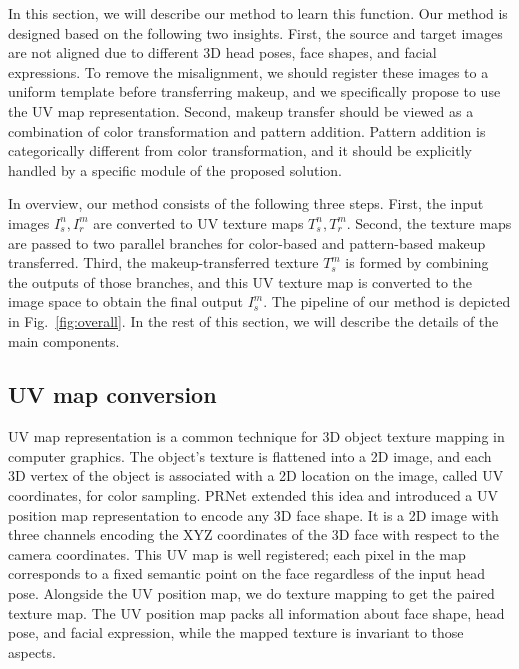 \documentclass[final]{cvpr}
\newcommand{\Fref}[1]{Fig.~\ref{#1}}
\begin{document}
In this section, we will describe our method to learn this function. Our method is designed based on the following two insights. First, the source and target images are not aligned due to different 3D head poses, face shapes, and facial expressions. To remove the misalignment, we should register these images to a uniform template before transferring makeup, and we specifically propose to use the UV map representation. Second, makeup transfer should be viewed as a combination of color transformation and pattern addition. Pattern addition is categorically different from color transformation, and it should be explicitly handled by a specific module of the proposed solution.


In overview, our method consists of the following three steps. First, the input images $I_{s}^{n}, I_{r}^{m}$ are converted to UV texture maps $T_{s}^{n}, T_{r}^{m}$. Second, the texture maps are passed to two parallel branches for color-based and pattern-based makeup transferred. Third, the makeup-transferred texture $T_{s}^{m}$ is formed by combining the outputs of those branches, and this UV texture map is converted to the image space to obtain the final output $I_{s}^{m}$. The pipeline of our method is depicted in \Fref{fig:overall}. In the rest of this section, we will describe the details of the main components. 








\subsection{UV map conversion}\label{sec:uv}
\vspace{-2mm}
UV map representation is a common technique for 3D object texture mapping in computer graphics. The object's texture is flattened into a 2D image, and each 3D vertex of the object is associated with a 2D location on the image, called UV coordinates, for color sampling. PRNet \cite{feng2018prn} extended this idea and introduced a UV position map representation to encode any 3D face shape. It is a 2D image with three channels encoding the XYZ coordinates of the 3D face with respect to the camera coordinates. This UV map is well registered; each pixel in the map corresponds to a fixed semantic point on the face regardless of the input head pose. Alongside the UV position map, we do texture mapping to get the paired texture map. The UV position map packs all information about face shape, head pose, and facial expression, while the mapped texture is invariant to those aspects.
\end{document}

